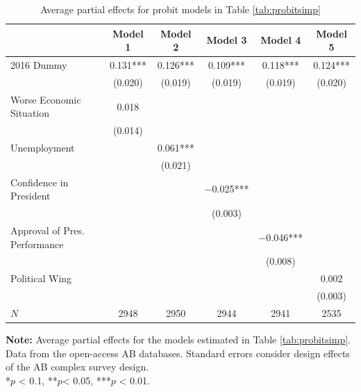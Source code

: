 \documentclass[12pt,a4]{article}\usepackage[]{graphicx}\usepackage[]{xcolor}
\begin{document}
\begin{table}[htbp]
\caption{Average partial effects for probit models in Table \ref{tab:probitsimp}}
\begin{center}
\label{tab:probitsimpape}

\begin{tabular}[t]{lccccc}
\toprule
  & Model 1 & Model 2 & Model 3 & Model 4 & Model 5\\
\midrule
2016 Dummy & \num{0.131}*** & \num{0.126}*** & \num{0.109}*** & \num{0.118}*** & \num{0.124}***\\
 & (\num{0.020}) & (\num{0.019}) & (\num{0.019}) & (\num{0.019}) & (\num{0.020})\\
Worse Economic Situation & \num{0.018} &  &  &  & \\
 & (\num{0.014}) &  &  &  & \\
Unemployment &  & \num{0.061}*** &  &  & \\
 &  & (\num{0.021}) &  &  & \\
Confidence in President &  &  & \num{-0.025}*** &  & \\
 &  &  & (\num{0.003}) &  & \\
Approval of Pres. Performance &  &  &  & \num{-0.046}*** & \\
 &  &  &  & (\num{0.008}) & \\
Political Wing &  &  &  &  & \num{0.002}\\
 &  &  &  &  & (\num{0.003})\\
\midrule
$N$ & \num{2948} & \num{2950} & \num{2944} & \num{2941} & \num{2535}\\
\bottomrule
\end{tabular}


\vspace{0.25cm}
\end{center}
\textbf{Note:} Average partial effects for the models estimated in Table \ref{tab:probitsimp}. Data from the open-access AB databases. Standard errors consider design effects of the AB complex survey design.\\
*$p$ < 0.1, **$p$< 0.05, ***$p$ < 0.01.
\end{table}
\end{document}
